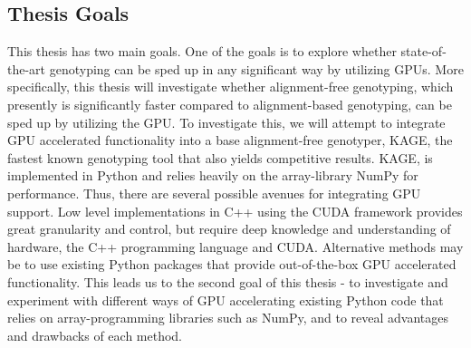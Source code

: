 \subsection{Thesis Goals} \label{introduction:thesis_goals}
This thesis has two main goals.
One of the goals is to explore whether state-of-the-art genotyping can be sped up in any significant way by utilizing GPUs.
More specifically, this thesis will investigate whether alignment-free genotyping, which presently is significantly faster compared to alignment-based genotyping, can be sped up by utilizing the GPU.
To investigate this, we will attempt to integrate GPU accelerated functionality into a base alignment-free genotyper, KAGE, the fastest known genotyping tool that also yields competitive results.
KAGE, is implemented in Python and relies heavily on the array-library NumPy for performance.
Thus, there are several possible avenues for integrating GPU support. 
Low level implementations in C++ using the CUDA framework provides great granularity and control, but require deep knowledge and understanding of hardware, the C++ programming language and CUDA.
Alternative methods may be to use existing Python packages that provide out-of-the-box GPU accelerated functionality.
This leads us to the second goal of this thesis - to investigate and experiment with different ways of GPU accelerating existing Python code that relies on array-programming libraries such as NumPy, and to reveal advantages and drawbacks of each method.
